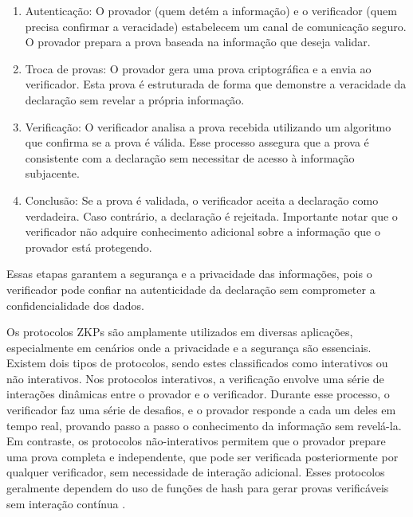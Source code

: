 \begin{enumerate}

    \item Autenticação: O provador (quem detém a informação) e o verificador (quem precisa confirmar a veracidade) estabelecem um canal de comunicação seguro. O provador prepara a prova baseada na informação que deseja validar.

    \item Troca de provas: O provador gera uma prova criptográfica e a envia ao verificador. Esta prova é estruturada de forma que demonstre a veracidade da declaração sem revelar a própria informação.

    \item Verificação: O verificador analisa a prova recebida utilizando um algoritmo que confirma se a prova é válida. Esse processo assegura que a prova é consistente com a declaração sem necessitar de acesso à informação subjacente.

    \item Conclusão: Se a prova é validada, o verificador aceita a declaração como verdadeira. Caso contrário, a declaração é rejeitada. Importante notar que o verificador não adquire conhecimento adicional sobre a informação que o provador está protegendo.
    
\end{enumerate}
    

Essas etapas garantem a segurança e a privacidade das informações, pois o verificador pode confiar na autenticidade da declaração sem comprometer a confidencialidade dos dados.


Os protocolos \acs{ZKP}s são amplamente utilizados em diversas aplicações, especialmente em cenários onde a privacidade e a segurança são essenciais. Existem dois tipos de protocolos, sendo estes classificados como interativos ou não interativos. Nos protocolos interativos, a verificação envolve uma série de interações dinâmicas entre o provador e o verificador. Durante esse processo, o verificador faz uma série de desafios, e o provador responde a cada um deles em tempo real, provando passo a passo o conhecimento da informação sem revelá-la. Em contraste, os protocolos não-interativos permitem que o provador prepare uma prova completa e independente, que pode ser verificada posteriormente por qualquer verificador, sem necessidade de interação adicional. Esses protocolos geralmente dependem do uso de funções de hash para gerar provas verificáveis sem interação contínua \cite{petkus2019zkSNARK}.


